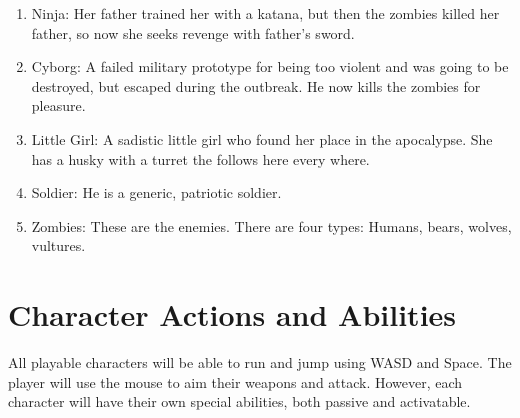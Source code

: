 \documentclass{article}
\begin{document}
\begin{enumerate}

\item Ninja: Her father trained her with a katana, but then the zombies killed her father, so now she seeks revenge with father’s sword. 

\item Cyborg: A failed military prototype for being too violent and was going to be destroyed, but escaped during the outbreak. He now kills the zombies for pleasure.
    

\item Little Girl: A sadistic little girl who found her place in the apocalypse. She has a husky with a turret the follows here every where. 
    

\item Soldier: He is a generic, patriotic soldier.
    

\item Zombies: These are the enemies. There are four types: Humans, bears, wolves, vultures.

\end{enumerate}

\section{Character Actions and Abilities}

All playable characters will be able to run and jump using WASD and Space. The player will use the mouse to aim their weapons and attack. However, each character will have their own special abilities, both passive and activatable.
\end{document}
